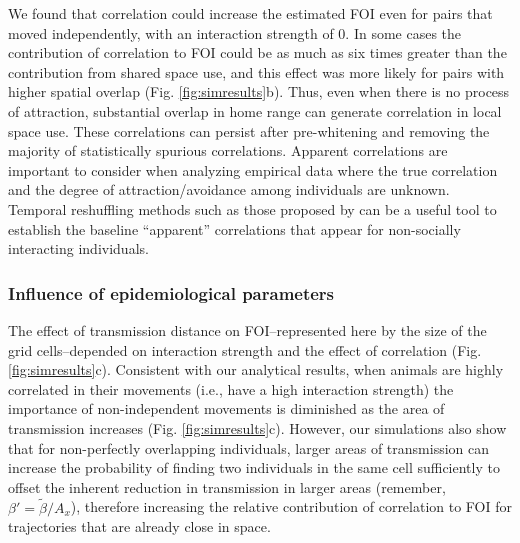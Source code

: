 \documentclass[letterpaper]{article}
\begin{document}
We found that correlation could increase the estimated FOI even for pairs that moved independently, with an interaction strength of 0. In some cases the contribution of correlation to FOI could be as much as six times greater than the contribution from shared space use, and this effect was more likely for pairs with higher spatial overlap (Fig. \ref{fig:simresults}b). %
Thus, even when there is no process of attraction, substantial overlap in home range can generate correlation in local space use.%
These correlations can persist after pre-whitening and removing the majority of statistically spurious correlations. Apparent correlations are important to consider when analyzing empirical data where the true correlation and the degree of attraction/avoidance among individuals are unknown. Temporal reshuffling methods such as those proposed by \citet{Spiegel2016} can be a useful tool to establish the baseline ``apparent'' correlations that appear for non-socially interacting individuals. 

\subsubsection*{Influence of epidemiological parameters}

The effect of transmission distance on FOI--represented here by the size of the grid cells--depended on interaction strength and the effect of correlation (Fig. \ref{fig:simresults}c). Consistent with our analytical results, when animals are highly correlated in their movements (i.e., have a high interaction strength) the importance of non-independent movements is diminished as the area of transmission increases (Fig. \ref{fig:simresults}c).
However, our simulations also show that for non-perfectly overlapping individuals, larger areas of transmission can increase the probability of finding two individuals in the same cell sufficiently to offset the inherent reduction in transmission in larger areas (remember, $\beta' = \tilde{\beta} / A_x$), therefore increasing the relative contribution of correlation to FOI for trajectories that are already close in space.
\end{document}
